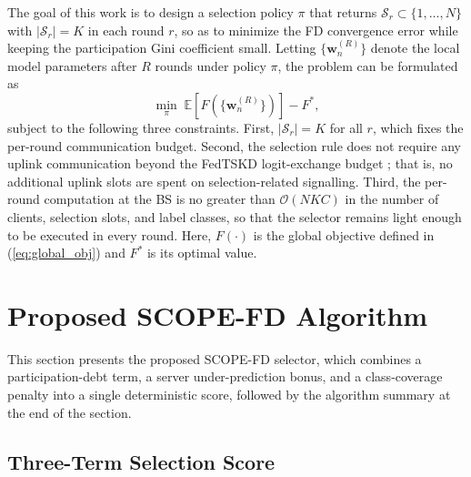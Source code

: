 \documentclass[journal]{IEEEtran}
\begin{document}
The goal of this work is to design a selection policy $\pi$ that returns $\mathcal{S}_r \subset \{1, \dots, N\}$ with $|\mathcal{S}_r| = K$ in each round $r$, so as to minimize the FD convergence error while keeping the participation Gini coefficient small. Letting $\{\bm{w}_n^{(R)}\}$ denote the local model parameters after $R$ rounds under policy $\pi$, the problem can be formulated as
\begin{equation}
\min_{\pi} \; \mathbb{E}\!\left[F\!\left(\{\bm{w}_n^{(R)}\}\right)\right] - F^{*},
\label{eq:problem}
\end{equation}
subject to the following three constraints. First, $|\mathcal{S}_r| = K$ for all $r$, which fixes the per-round communication budget. Second, the selection rule does not require any uplink communication beyond the FedTSKD logit-exchange budget \cite{mu2024fedtskd}; that is, no additional uplink slots are spent on selection-related signalling. Third, the per-round computation at the BS is no greater than $\mathcal{O}(NKC)$ in the number of clients, selection slots, and label classes, so that the selector remains light enough to be executed in every round. Here, $F(\cdot)$ is the global objective defined in (\ref{eq:global_obj}) and $F^{*}$ is its optimal value.

\section{Proposed SCOPE-FD Algorithm}
\label{sec:scope-alg}

This section presents the proposed SCOPE-FD selector, which combines a participation-debt term, a server under-prediction bonus, and a class-coverage penalty into a single deterministic score, followed by the algorithm summary at the end of the section.

\subsection{Three-Term Selection Score}
\label{ssec:three-term-score}
\end{document}
